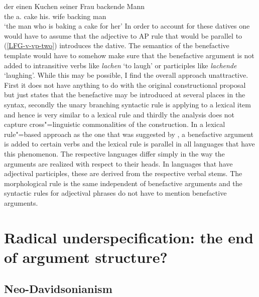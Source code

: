 \ex
\gll der einen Kuchen seiner Frau backende Mann\\
     the a.\acc{} cake  his.\dat{} wife backing man\\
\glt `the man who is baking a cake for her'
\zl
In order to account for these datives one would have to assume that the adjective to AP rule that
would be parallel to (\ref{LFG-v-vp-two}) introduces the dative. The semantics of the benefactive
template would have to somehow make sure that the benefactive argument is not added to intransitive
verbs like \emph{lachen} `to laugh' or participles like \emph{lachende} `laughing'. While this may
be possible, I find the overall approach unattractive. First it does not have anything to do with
the original constructional proposal but just states that the benefactive may be introduced at
several places in the syntax, secondly the unary branching syntactic rule is applying to a lexical
item and hence is very similar to a lexical rule and thirdly the analysis does not capture cross"=linguistic commonalities of the
construction. In a lexical rule"=based approach as the one that was suggested by \citet[Section~5]{BC99a}, a benefactive argument is added to certain verbs
and the lexical rule is parallel in all languages that have this phenomenon. The respective
languages differ simply in the way the arguments are realized with respect to their heads. In languages
that have adjectival participles, these are derived from the respective verbal stems. The
morphological rule is the same independent of benefactive arguments and the syntactic rules for
adjectival phrases do not have to mention benefactive arguments.



\section{Radical underspecification: the end of argument structure?}
\label{radical-sec}

\subsection{Neo-Davidsonianism}

